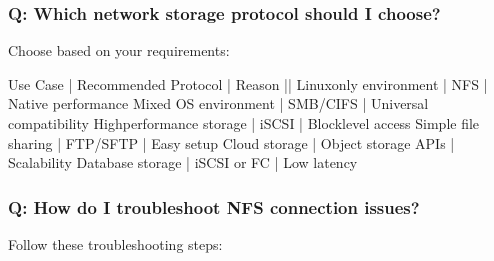 \documentclass[letterpaper,10pt,english]{sphinxmanual}
\begin{document}
\subsubsection{Q: Which network storage protocol should I choose?}
\label{\detokenize{network-storage:q-which-network-storage-protocol-should-i-choose}}
\sphinxAtStartPar
{} Choose based on your requirements:

\begin{sphinxVerbatim}[commandchars=\\\{\}]
Use Case                    | Recommended Protocol | Reason
\PYGZhy{}\PYGZhy{}\PYGZhy{}\PYGZhy{}\PYGZhy{}\PYGZhy{}\PYGZhy{}\PYGZhy{}\PYGZhy{}\PYGZhy{}\PYGZhy{}\PYGZhy{}\PYGZhy{}\PYGZhy{}\PYGZhy{}\PYGZhy{}\PYGZhy{}\PYGZhy{}\PYGZhy{}\PYGZhy{}\PYGZhy{}\PYGZhy{}\PYGZhy{}\PYGZhy{}\PYGZhy{}\PYGZhy{}\PYGZhy{}\PYGZhy{}|\PYGZhy{}\PYGZhy{}\PYGZhy{}\PYGZhy{}\PYGZhy{}\PYGZhy{}\PYGZhy{}\PYGZhy{}\PYGZhy{}\PYGZhy{}\PYGZhy{}\PYGZhy{}\PYGZhy{}\PYGZhy{}\PYGZhy{}\PYGZhy{}\PYGZhy{}\PYGZhy{}\PYGZhy{}\PYGZhy{}\PYGZhy{}|\PYGZhy{}\PYGZhy{}\PYGZhy{}\PYGZhy{}\PYGZhy{}\PYGZhy{}\PYGZhy{}\PYGZhy{}\PYGZhy{}\PYGZhy{}\PYGZhy{}\PYGZhy{}\PYGZhy{}\PYGZhy{}\PYGZhy{}\PYGZhy{}\PYGZhy{}\PYGZhy{}
Linux\PYGZhy{}only environment     | NFS                 | Native performance
Mixed OS environment       | SMB/CIFS            | Universal compatibility
High\PYGZhy{}performance storage    | iSCSI               | Block\PYGZhy{}level access
Simple file sharing         | FTP/SFTP            | Easy setup
Cloud storage              | Object storage APIs  | Scalability
Database storage           | iSCSI or FC         | Low latency
\end{sphinxVerbatim}


\subsubsection{Q: How do I troubleshoot NFS connection issues?}
\label{\detokenize{network-storage:q-how-do-i-troubleshoot-nfs-connection-issues}}
\sphinxAtStartPar
{} Follow these troubleshooting steps:
\end{document}
